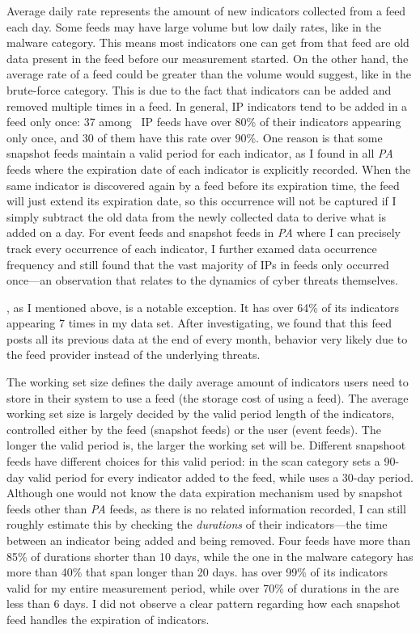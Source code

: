 Average daily rate represents the amount of new indicators collected from a feed each day.
Some feeds may have large volume but low daily rates, like {\feedfeodo} in the malware
category. This means most indicators one can get from that feed are old
data present in the feed before our
measurement started. On the other hand, the average rate of a feed could be
greater than the volume would suggest, like {\feednothink} in the brute-force category.
This is due to the fact that indicators can be added and removed multiple times in a
feed. In general, IP indicators tend to be added in a feed only once: 37 among \numipfeeds\
IP feeds have over 80\% of their indicators appearing only once, and 30 of them have this rate over 90\%.
One reason is that some snapshot feeds maintain a valid period for each indicator, as
I found in all \emph{PA} feeds where the expiration date of each indicator is explicitly
recorded. When the same indicator is discovered again by a feed before its expiration time,
the feed will just extend its expiration date, so this occurrence will not be captured
if I simply subtract the old data from the newly collected data to derive what is added on a day.
For event feeds and snapshot feeds in \emph{PA} where I can precisely track every occurrence
of each indicator, I further examed data occurrence frequency and still found that the vast
majority of IPs in feeds only occurred once---an observation that relates to the dynamics
of cyber threats themselves.

\feednothink, as I mentioned above, is a notable exception. It has over 64\% of its
indicators appearing 7 times in my data set. After investigating, we
found that this feed posts all its previous data at the end of every month, behavior very likely
due to the feed provider instead of the underlying threats.

The working set size defines the daily average amount of indicators users need to store in their
system to use a feed (the storage cost of using a feed). The average
working set size is largely decided by the valid period length
of the indicators, controlled either
by the feed (snapshot feeds) or the user (event feeds). The longer the valid period is,
the larger the working set will be. Different snapshoot feeds have different choices for this
valid period: {\feedTSAlienVault} in the scan category sets a 90-day valid period for
every indicator added to the feed, while {\feedTSAbusech} uses a 30-day period. Although one would not
know the data expiration mechanism used by snapshot feeds other than \emph{PA} feeds, as
there is no related information recorded, I can still roughly estimate this by checking the
\emph{durations} of their indicators---the time between an indicator being added and being removed.
Four {\feedetiprep} feeds have more than 85\% of durations shorter than 10 days, while the one in
the malware category has more than 40\% that span longer than 20 days. {\feedfeodo} has over 99\% of
its indicators valid for my entire measurement period, while over 70\% of durations in the
{\feedzeus} are less than 6 days. I did not observe a clear pattern regarding how each snapshot
feed handles the expiration of indicators.
